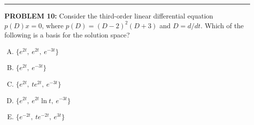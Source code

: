 \documentclass[12pt]{amsart}
\newcommand{\divider}{
  \vspace{-1em} %
  \noindent
  \raisebox{-0.15ex}{\textbullet}%
  \hspace{0.5em}%
  \rule[0.5ex]{0.95\textwidth}{1.0pt}%
  \hspace{0.5em}%
  \raisebox{-0.15ex}{\textbullet}%
  \vspace{0em} %
}
\begin{document}
\divider

{\bf PROBLEM 10:}
%
Consider the third-order linear differential equation $p(D)x = 0$, where
$p(D) = (D - 2)^2 (D + 3)$ and $D = d/dt$. Which of the following is a basis for the solution space?

\begin{enumerate}[(A)]
\item $\{e^{2t},\ e^{2t},\ e^{-3t}\}$
\item $\{e^{2t},\ e^{-3t}\}$
\item $\{e^{2t},\ t e^{2t},\ e^{-3t}\}$
\item $\{e^{2t},\ e^{2t} \ln t,\ e^{-3t}\}$
\item $\{e^{-2t},\ t e^{-2t},\ e^{3t}\}$
\end{enumerate}

%
%
%
\end{document}
